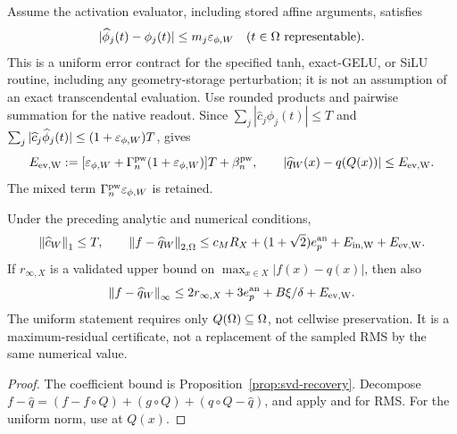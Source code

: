 Assume the activation evaluator, including stored affine arguments, satisfies
\[
 |\widehat\phi_j(t)-\phi_j(t)|\le m_j\varepsilon_{\phi,W}
 \quad(t\in\Omega\text{ representable}).
\]
This is a uniform error contract for the specified tanh, exact-GELU, or SiLU
routine, including any geometry-storage perturbation; it is not an assumption
of an exact transcendental evaluation. Use rounded products and pairwise
summation for the native readout. Since
$\sum_j|\widehat c_j\phi_j(t)|\le T$ and
$\sum_j|\widehat c_j\widehat\phi_j(t)|\le(1+\varepsilon_{\phi,W})T$,
 gives
\begin{equation}
 E_{\rm ev,W}:=
 [\varepsilon_{\phi,W}+\Gamma_n^{\rm pw}(1+\varepsilon_{\phi,W})]T+\beta_n^{\rm pw},
 \qquad
 |\widehat q_W(x)-q(Q(x))|\le E_{\rm ev,W}.
 \label{eq:evaluation}
\end{equation}
The mixed term $\Gamma_n^{\rm pw}\varepsilon_{\phi,W}$ is retained.

\begin{theorem}
\label{thm:computed}
Under the preceding analytic and numerical conditions,
\begin{equation}
 \left\lVert \widehat c_W\right\rVert_1\le T,\qquad
 \left\lVert f-\widehat q_W\right\rVert_{2,\Omega}
 \le c_M R_X+(1+\sqrt2)e_p^{\rm an}+E_{\rm in,W}+E_{\rm ev,W}.
 \label{eq:computed-rms}
\end{equation}
If $r_{\infty,X}$ is a validated upper bound on
$\max_{x\in X}|f(x)-q(x)|$, then also
\begin{equation}
 \left\lVert f-\widehat q_W\right\rVert_\infty
 \le2r_{\infty,X}+3e_p^{\rm an}+B\xi/\delta+E_{\rm ev,W}.
 \label{eq:computed-uniform}
\end{equation}
The uniform statement requires only $Q(\Omega)\subseteq\Omega$, not cellwise
preservation. It is a maximum-residual certificate, not a replacement of the
sampled RMS by the same numerical value.
\end{theorem}
\begin{proof}
The coefficient bound is Proposition~\ref{prop:svd-recovery}.
Decompose $f-\widehat q=(f-f\circ Q)+(g\circ Q)+(q\circ Q-\widehat q)$,
and apply  and  for RMS.
For the uniform norm, use  at $Q(x)$.
\end{proof}

